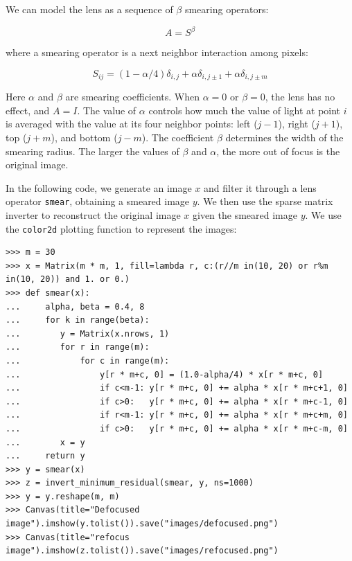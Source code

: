 \documentclass[justified, sixbynine]{tufte-book}
\def\ft{\small\tt}
\theoremstyle{plain}%
\newtheorem * {corollary}{Corollary}
\theoremstyle{definition}
\theoremstyle{remark}
\newtheorem * {remark}{Remark}
\newtheorem * {note}{Note}
\begin{document}
\begin{fullwidth}
We can model the lens as a sequence of $\beta$ smearing operators:

\begin{equation}
A = S^{\beta}
\end{equation}

where a smearing operator is a next neighbor interaction among pixels:

\begin{equation}
S_{ij} = (1-\alpha/4) \delta_{i, j} + \alpha \delta_{i, j\pm 1} + \alpha \delta_{i, j\pm m}
\end{equation}

Here $\alpha$ and $\beta$ are smearing coefficients. When $\alpha=0$ or $\beta=0$, the lens has no effect, and $A = I$. The value of $\alpha$ controls how much the value of light at point $i$ is averaged with the value at its four neighbor points: left ($j-1$), right ($j+1$), top ($j+m$), and bottom ($j-m$). The coefficient $\beta$ determines the width of the smearing radius. The larger the values of $\beta$ and $\alpha$, the more out of focus is the original image.


In the following code, we generate an image $x$ and filter it through a lens operator {\ft smear}, obtaining a smeared image $y$. We then use the sparse matrix inverter to reconstruct the original image $x$ given the smeared image $y$. We use the {\ft color2d} plotting function to represent the images:

\begin{lstlisting}[caption={in file: {\ft nlib.py}}]
>>> m = 30
>>> x = Matrix(m * m, 1, fill=lambda r, c:(r//m in(10, 20) or r%m in(10, 20)) and 1. or 0.)
>>> def smear(x):
...     alpha, beta = 0.4, 8
...     for k in range(beta):
...        y = Matrix(x.nrows, 1)
...        for r in range(m):
...            for c in range(m):
...                y[r * m+c, 0] = (1.0-alpha/4) * x[r * m+c, 0]
...                if c<m-1: y[r * m+c, 0] += alpha * x[r * m+c+1, 0]
...                if c>0:   y[r * m+c, 0] += alpha * x[r * m+c-1, 0]
...                if r<m-1: y[r * m+c, 0] += alpha * x[r * m+c+m, 0]
...                if c>0:   y[r * m+c, 0] += alpha * x[r * m+c-m, 0]
...        x = y
...     return y
>>> y = smear(x)
>>> z = invert_minimum_residual(smear, y, ns=1000)
>>> y = y.reshape(m, m)
>>> Canvas(title="Defocused image").imshow(y.tolist()).save("images/defocused.png")
>>> Canvas(title="refocus image").imshow(z.tolist()).save("images/refocused.png")
\end{lstlisting}


\end{fullwidth}
\end{document}
